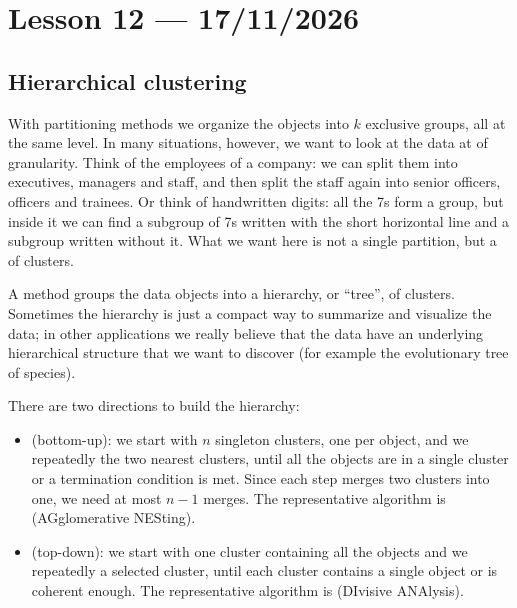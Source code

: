 \section{Lesson 12 --- 17/11/2026}

\subsection{Hierarchical clustering}

With partitioning methods we organize the objects into $k$ exclusive groups, all at the same level. In many situations, however, we want to look at the data at  of granularity. Think of the employees of a company: we can split them into executives, managers and staff, and then split the staff again into senior officers, officers and trainees. Or think of handwritten digits: all the 7s form a group, but inside it we can find a subgroup of 7s written with the short horizontal line and a subgroup written without it. What we want here is not a single partition, but a  of clusters.

A  method groups the data objects into a hierarchy, or ``tree'', of clusters. Sometimes the hierarchy is just a compact way to summarize and visualize the data; in other applications we really believe that the data have an underlying hierarchical structure that we want to discover (for example the evolutionary tree of species).

There are two directions to build the hierarchy:
\begin{itemize}
  \item {} (bottom-up): we start with $n$ singleton clusters, one per object, and we repeatedly  the two nearest clusters, until all the objects are in a single cluster or a termination condition is met. Since each step merges two clusters into one, we need at most $n-1$ merges. The representative algorithm is  (AGglomerative NESting).
  \item {} (top-down): we start with one cluster containing all the objects and we repeatedly  a selected cluster, until each cluster contains a single object or is coherent enough. The representative algorithm is  (DIvisive ANAlysis).
\end{itemize}

